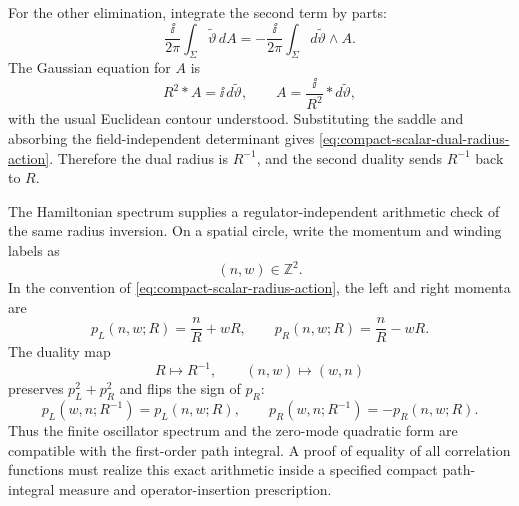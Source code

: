 For the other elimination, integrate the second term by parts:
\[
  \frac{\ii}{2\pi}\int_\Sigma\widetilde\vartheta\,dA
  =
  -\frac{\ii}{2\pi}\int_\Sigma d\widetilde\vartheta\wedge A .
\]
The Gaussian equation for \(A\) is
\begin{equation}
  R^2 *A=\ii\, d\widetilde\vartheta ,
  \qquad
  A=\frac{\ii}{R^2}*d\widetilde\vartheta ,
  \label{eq:compact-scalar-gaussian-saddle}
\end{equation}
with the usual Euclidean contour understood.  Substituting the saddle and
absorbing the field-independent determinant gives
\eqref{eq:compact-scalar-dual-radius-action}.  Therefore the dual radius is
\(R^{-1}\), and the second duality sends \(R^{-1}\) back to \(R\).

The Hamiltonian spectrum supplies a regulator-independent arithmetic check of
the same radius inversion.  On a spatial circle, write the momentum and
winding labels as
\[
  (n,w)\in\mathbb Z^2 .
\]
In the convention of \eqref{eq:compact-scalar-radius-action}, the left and
right momenta are
\begin{equation}
  p_L(n,w;R)=\frac{n}{R}+wR,\qquad
  p_R(n,w;R)=\frac{n}{R}-wR .
  \label{eq:compact-scalar-left-right-momenta}
\end{equation}
The duality map
\begin{equation}
  R\longmapsto R^{-1},\qquad (n,w)\longmapsto(w,n)
  \label{eq:compact-scalar-momentum-winding-map}
\end{equation}
preserves \(p_L^2+p_R^2\) and flips the sign of \(p_R\):
\begin{equation}
  p_L(w,n;R^{-1})=p_L(n,w;R),\qquad
  p_R(w,n;R^{-1})=-p_R(n,w;R).
  \label{eq:compact-scalar-spectrum-invariance}
\end{equation}
Thus the finite oscillator spectrum and the zero-mode quadratic form are
compatible with the first-order path integral.  A proof of equality of all
correlation functions must realize this exact arithmetic inside a specified
compact path-integral measure and operator-insertion prescription.

